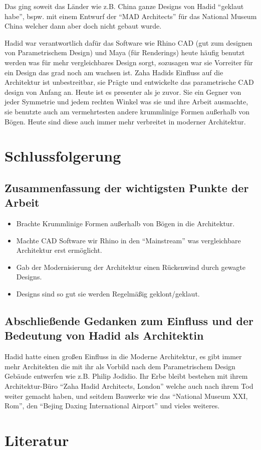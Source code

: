 \documentclass[a4paper]{article}
\begin{document}
Das ging soweit das Länder wie z.B. China ganze Designs von Hadid ``geklaut
habe'', bspw. mit einem Entwurf der ``MAD Architects'' für das National Museum
China welcher dann aber doch nicht gebaut wurde. 

Hadid war verantwortlich dafür das Software wie Rhino CAD (gut zum designen von
Parametrischem Design) und Maya (für Renderings) heute häufig benutzt werden
was für mehr vergleichbares Design sorgt, sozusagen war sie Vorreiter für ein
Design das grad noch am wachsen ist. Zaha Hadids Einfluss auf die Architektur
ist unbestreitbar, sie Prägte und entwickelte das parametrische CAD design von
Anfang an. Heute ist es presenter als je zuvor. Sie ein Gegner von jeder
Symmetrie und jedem rechten Winkel was
sie und ihre Arbeit ausmachte, sie benutzte auch am vermehrtesten andere
krummlinige Formen außerhalb von Bögen. Heute sind diese auch immer mehr
verbreitet in moderner Architektur. 

\section{Schlussfolgerung}
\subsection{Zusammenfassung der wichtigsten Punkte der Arbeit}
\begin{itemize}
	\item Brachte Krummlinige Formen außerhalb von Bögen in die Architektur.
	\item Machte CAD Software wir Rhino in den ``Mainstream'' was vergleichbare
		Architektur erst ermöglicht.
	\item Gab der Modernisierung der Architektur einen Rückenwind durch gewagte
		Designs.
	\item Designs sind so gut sie werden Regelmäßig geklont/geklaut.
\end{itemize}

\subsection{Abschließende Gedanken zum Einfluss und der Bedeutung von Hadid als
Architektin}
Hadid hatte einen großen Einfluss in die Moderne Architektur, es gibt immer mehr
Architekten die mit ihr als Vorbild nach dem Parametrischem Design Gebäude
entwerfen wie z.B. Philip Jodidio. Ihr Erbe bleibt bestehen mit ihrem
Architektur-Büro ``Zaha Hadid Architects, London'' welche auch nach ihrem Tod
weiter gemacht haben, und seitdem Bauwerke wie das ``National Museum XXI, Rom'',
den ``Bejing Daxing International Airport'' und vieles weiteres.


\clearpage
\section{Literatur}
\printbibliography
\end{document}
